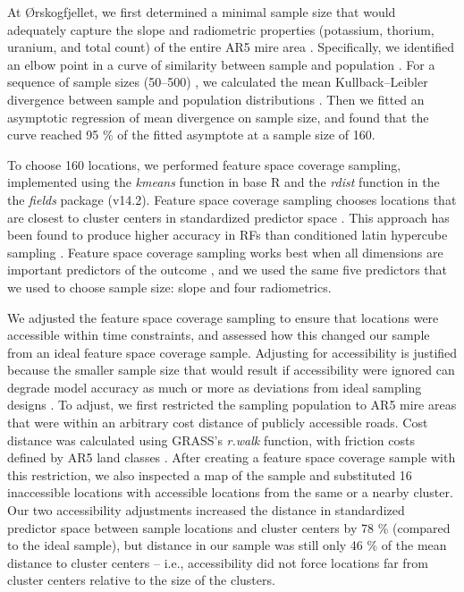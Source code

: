 \documentclass[soil, manuscript]{copernicus}
\begin{document}
At Ørskogfjellet, we first determined a minimal sample size that would adequately capture the slope and radiometric properties (potassium, thorium, uranium, and total count) of the entire AR5 mire area \citep{sauretteDivergenceMetricsDetermining2023}.
Specifically, we identified an elbow point in a curve of similarity between sample and population \citep{maloneMethodsImproveUtility2019}.
For a sequence of sample sizes (50--500) \citep[ten replicates each, drawn by conditioned latin hypercube sampling,][]{minasnyConditionedLatinHypercube2006, roudierClhsPackageConditioned2011}, we calculated the mean Kullback--Leibler divergence between sample and population distributions \citep{maloneMethodsImproveUtility2019, sauretteDivergenceMetricsDetermining2023}.
Then we fitted an asymptotic regression of mean divergence on sample size, and found that the curve reached 95 \% of the fitted asymptote at a sample size of 160.

To choose 160 locations, we performed feature space coverage sampling, implemented using the \emph{kmeans} function in base R and the \emph{rdist} function in the the \emph{fields} package (v14.2).
Feature space coverage sampling chooses locations that are closest to cluster centers in standardized predictor space \citep{brusSamplingDigitalSoil2019}.
This approach has been found to produce higher accuracy in RFs than conditioned latin hypercube sampling \citep{wadouxSamplingDesignOptimization2019, maComparisonConditionedLatin2020}.
Feature space coverage sampling works best when all dimensions are important predictors of the outcome \citep{wadouxSamplingDesignOptimization2019}, and we used the same five predictors that we used to choose sample size: slope and four radiometrics.

We adjusted the feature space coverage sampling to ensure that locations were accessible within time constraints, and assessed how this changed our sample from an ideal feature space coverage sample.
Adjusting for accessibility is justified because the smaller sample size that would result if accessibility were ignored can degrade model accuracy as much or more as deviations from ideal sampling designs \citep{wadouxSamplingDesignOptimization2019, maComparisonConditionedLatin2020}.
To adjust, we first restricted the sampling population to AR5 mire areas that were within an arbitrary cost distance of publicly accessible roads.
Cost distance was calculated using GRASS's \emph{r.walk} function, with friction costs defined by AR5 land classes \citep{GRASSv8-2}.
After creating a feature space coverage sample with this restriction, we also inspected a map of the sample and substituted 16 inaccessible locations with accessible locations from the same or a nearby cluster.
Our two accessibility adjustments increased the distance in standardized predictor space between sample locations and cluster centers by 78 \% (compared to the ideal sample), but distance in our sample was still only 46 \% of the mean distance to cluster centers -- i.e., accessibility did not force locations far from cluster centers relative to the size of the clusters.
\end{document}
